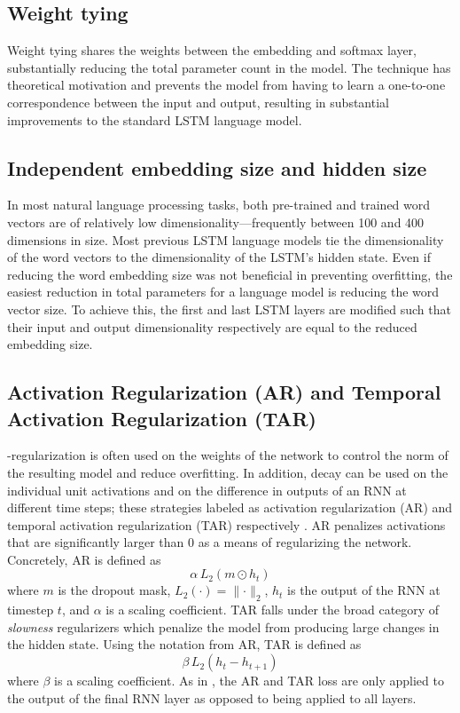 \documentclass{article}
\begin{document}
\subsection{Weight tying}

Weight tying \citep{Inan2016, Press2016} shares the weights between the embedding and softmax layer, substantially reducing the total parameter count in the model.
The technique has theoretical motivation \citep{Inan2016} and prevents the model from having to learn a one-to-one correspondence between the input and output, resulting in substantial improvements to the standard LSTM language model.

\subsection{Independent embedding size and hidden size}

In most natural language processing tasks, both pre-trained and trained word vectors are of relatively low dimensionality---frequently between 100 and 400 dimensions in size.
Most previous LSTM language models tie the dimensionality of the word vectors to the dimensionality of the LSTM's hidden state.
Even if reducing the word embedding size was not beneficial in preventing overfitting, the easiest reduction in total parameters for a language model is reducing the word vector size.
To achieve this, the first and last LSTM layers are modified such that their input and output dimensionality respectively are equal to the reduced embedding size.

\subsection{Activation Regularization (AR) and Temporal Activation Regularization (TAR)}
\ltwo-regularization is often used on the weights of the network to control the norm of the resulting model and reduce overfitting. In addition, \ltwo decay can be used on the individual unit activations and on the difference in outputs of an RNN at different time steps; these strategies labeled as activation regularization (AR) and temporal activation regularization (TAR) respectively \cite{smerity-revisiting}.
AR penalizes activations that are significantly larger than $0$ as a means of regularizing the network. Concretely, AR is defined as
\[
\alpha \, L_2 (m \odot h_t) 
\]
where $m$ is the dropout mask, $L_2(\cdot) = \lVert \cdot \rVert_2$, $h_t$ is the output of the RNN at timestep $t$, and $\alpha$ is a scaling coefficient. TAR falls under the broad category of \textit{slowness} regularizers \citep{Hinton1989, Foldiak1991, Luciw2012, Jonschkowski2015LearningSR} which penalize the model from producing large changes in the hidden state. Using the notation from AR, TAR is defined as
\[
\beta \, L_2 (h_t - h_{t+1})
\]
where $\beta$ is a scaling coefficient.
As in \citet{smerity-revisiting}, the AR and TAR loss are only applied to the output of the final RNN layer as opposed to being applied to all layers.
\end{document}
